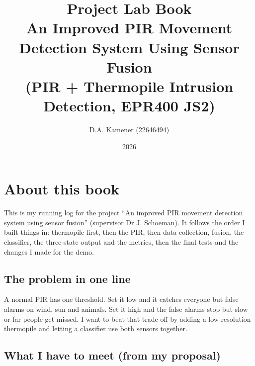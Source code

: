 \documentclass[11pt,a4paper]{article}
\title{Project Lab Book\\[4pt]\large An Improved PIR Movement Detection System Using Sensor Fusion\\(PIR + Thermopile Intrusion Detection, EPR400 JS2)}
\author{D.A. Kamener (22646494)}
\date{2026}
\begin{document}
\maketitle
\tableofcontents
\newpage

\hypertarget{about-this-book}{%
\section{About this
book}\label{about-this-book}}

This is my running log for the
project ``An improved PIR
movement detection system
using sensor fusion''
(supervisor Dr J. Schoeman).
It follows the order I built
things in: thermopile first,
then the PIR, then data
collection, fusion, the
classifier, the three-state
output and the metrics, then
the final tests and the
changes I made for the demo.

\hypertarget{the-problem-in-one-line}{%
\subsection{The problem in one
line}\label{the-problem-in-one-line}}

A normal PIR has one
threshold. Set it low and it
catches everyone but false
alarms on wind, sun and
animals. Set it high and the
false alarms stop but slow or
far people get missed. I want
to beat that trade-off by
adding a low-resolution
thermopile and letting a
classifier use both sensors
together.

\hypertarget{what-i-have-to-meet-from-my-proposal}{%
\subsection{What I have to
meet (from my
proposal)}\label{what-i-have-to-meet-from-my-proposal}}
\end{document}
